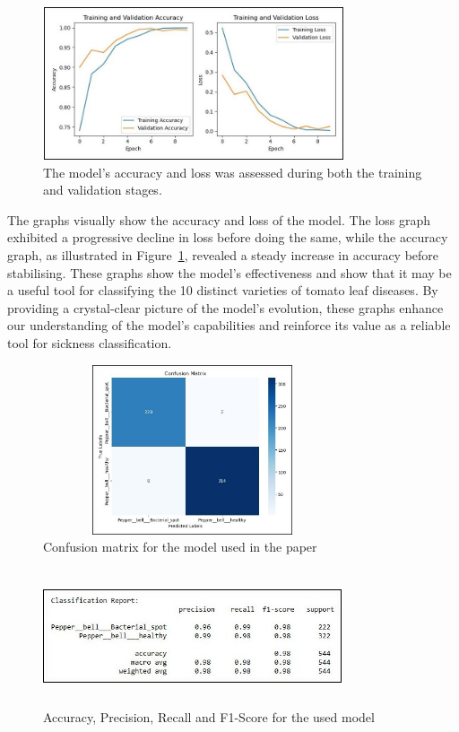 \documentclass[conference]{IEEEtran}
\begin{document}
 \begin{figure}[H]
 \includegraphics[width=8.9cm, height=4.5cm]{accuracy.jpg}
\caption{The model's accuracy  and loss was assessed during both the training and validation stages.}
\label{fig: Figure 3}
\end{figure}

The graphs visually show the accuracy and loss of the model. The loss graph exhibited a progressive decline in loss before doing the same, while the accuracy graph, as illustrated in Figure~\ref{fig: Figure 3}, revealed a steady increase in accuracy before stabilising. These graphs show the model's effectiveness and show that it may be a useful tool for classifying the 10 distinct varieties of tomato leaf diseases. By providing a crystal-clear picture of the model's evolution, these graphs enhance our understanding of the model's capabilities and reinforce its value as a reliable tool for sickness classification.


 \begin{figure}[H]
 \includegraphics[width=8.8cm, height=5cm]{confusion.jpg}
\caption{Confusion matrix for the model used in the paper}
\label{fig: Figure 4}
\end{figure}

 \begin{figure}[H]
 \includegraphics[width=8.8cm, height=4cm]{stats.jpg}
\caption{Accuracy, Precision, Recall and F1-Score for the used model}
\label{fig: Figure 5}
\end{figure}
\end{document}
